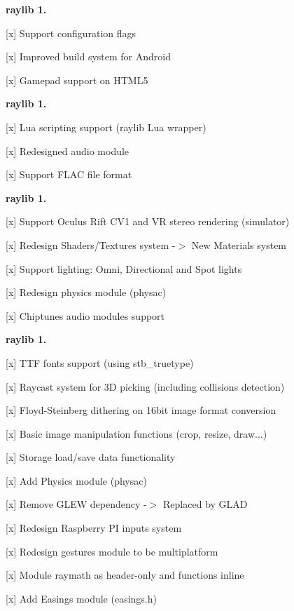 {\bfseries{raylib 1.}}
\begin{DoxyItemize}
\item \mbox{[}x\mbox{]} Support configuration flags
\item \mbox{[}x\mbox{]} Improved build system for Android
\item \mbox{[}x\mbox{]} Gamepad support on H\+T\+M\+L5
\end{DoxyItemize}

{\bfseries{raylib 1.}}
\begin{DoxyItemize}
\item \mbox{[}x\mbox{]} Lua scripting support (raylib Lua wrapper)
\item \mbox{[}x\mbox{]} Redesigned audio module
\item \mbox{[}x\mbox{]} Support F\+L\+AC file format
\end{DoxyItemize}

{\bfseries{raylib 1.}}
\begin{DoxyItemize}
\item \mbox{[}x\mbox{]} Support Oculus Rift C\+V1 and VR stereo rendering (simulator)
\item \mbox{[}x\mbox{]} Redesign Shaders/\+Textures system -\/$>$ New Materials system
\item \mbox{[}x\mbox{]} Support lighting\+: Omni, Directional and Spot lights
\item \mbox{[}x\mbox{]} Redesign physics module (physac)
\item \mbox{[}x\mbox{]} Chiptunes audio modules support
\end{DoxyItemize}

{\bfseries{raylib 1.}}
\begin{DoxyItemize}
\item \mbox{[}x\mbox{]} T\+TF fonts support (using stb\+\_\+truetype)
\item \mbox{[}x\mbox{]} Raycast system for 3D picking (including collisions detection)
\item \mbox{[}x\mbox{]} Floyd-\/\+Steinberg dithering on 16bit image format conversion
\item \mbox{[}x\mbox{]} Basic image manipulation functions (crop, resize, draw...)
\item \mbox{[}x\mbox{]} Storage load/save data functionality
\item \mbox{[}x\mbox{]} Add Physics module (physac)
\item \mbox{[}x\mbox{]} Remove G\+L\+EW dependency -\/$>$ Replaced by G\+L\+AD
\item \mbox{[}x\mbox{]} Redesign Raspberry PI inputs system
\item \mbox{[}x\mbox{]} Redesign gestures module to be multiplatform
\item \mbox{[}x\mbox{]} Module raymath as header-\/only and functions inline
\item \mbox{[}x\mbox{]} Add Easings module (easings.\+h) 
\end{DoxyItemize}